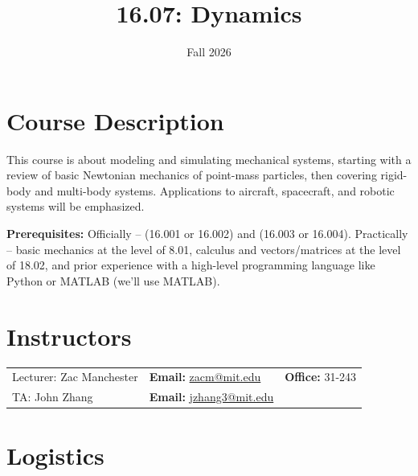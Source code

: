 \documentclass[11pt,letterpaper]{article}
\title{16.07: Dynamics}
\author{Fall 2026}
\date{}
\begin{document}
\maketitle


\section*{Course Description}

This course is about modeling and simulating mechanical systems, starting with a review of basic Newtonian mechanics of point-mass particles, then covering rigid-body and multi-body systems. Applications to aircraft, spacecraft, and robotic systems will be emphasized.

\medskip
\noindent
\textbf{Prerequisites:} Officially -- (16.001 or 16.002) and (16.003 or 16.004). Practically -- basic mechanics at the level of 8.01, calculus and vectors/matrices at the level of 18.02, and prior experience with a high-level programming language like Python or MATLAB (we'll use MATLAB).

\section*{Instructors}

\begin{center}
\begin{tabular}{l l l}
	Lecturer: Zac Manchester & \textbf{Email:} \href{mailto:zacm@mit.edu}{zacm@mit.edu} & \textbf{Office:} 31-243 \\
	TA: John Zhang & \textbf{Email:} \href{mailto:jzhang3@mit.edu}{jzhang3@mit.edu}
\end{tabular}
\end{center}

\section*{Logistics}
\end{document}
